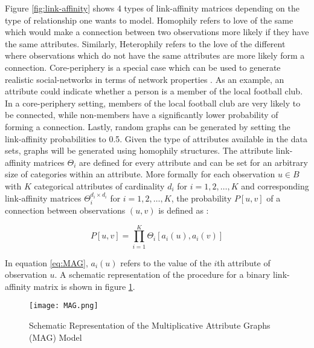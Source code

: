 	\noindent Figure \ref{fig:link-affinity} shows 4 types of link-affinity
	matrices depending on the type of relationship one wants to model. Homophily 
	refers to love of the same which would make a connection between two
	observations more likely if they have the same attributes. Similarly,
	Heterophily refers to the love of the different where observations which do 
	not have the same attributes are more likely form a connection. 
	Core-periphery is a special case which can be used to generate realistic 
	social-networks in terms of network properties 
	\citep[p. 139]{kim2012multiplicative}. As an example, an attribute could
	indicate whether a person is a member of the local football club. In a
	core-periphery setting, members of the local football club are very likely
	to be connected, while non-members have a significantly lower probability
	of forming a connection. Lastly, random graphs can be generated by setting the
	link-affinity probabilities to 0.5. Given the type of attributes available
	in the data sets, graphs will be generated using homophily structures. The 
	attribute link-affinity matrices $\Theta_i$ are defined for every attribute 
	and can be set for an arbitrary size of categories within an attribute. 
	More formally for each observation $u \in B$ with $K$ categorical attributes 
	of cardinality $d_i$ for $i = 1,2,\dots,K$ and corresponding link-affinity 
	matrices $\Theta_{i}^{d_{i} \times d_{i}}$ for $i=1,2,\dots,K$, the probability 
	$P[u,v]$ of a connection between observations $(u,v)$ is defined as 
	\citep[p. 119]{kim2012multiplicative}:

	\begin{equation}
		P[u,v] = \prod_{i=1}^{K}\Theta_{i}\left[a_{i}(u),a_i(v)\right]
		\label{eq:MAG}
	\end{equation}

	\noindent In equation \ref{eq:MAG}, $a_{i}(u)$ refers to the value of the 
	$i$th attribute of observation $u$. A schematic representation of the 
	procedure for a binary link-affinity matrix is shown in figure \ref{fig:MAG}.

	\begin{figure}[h]
		\centering
		\texttt{[image: MAG.png]}
		\caption{Schematic Representation of the 
			Multiplicative Attribute Graphs (MAG) Model}
		\cite[p. 120]{kim2012multiplicative}
		\label{fig:MAG}
	\end{figure}
	
